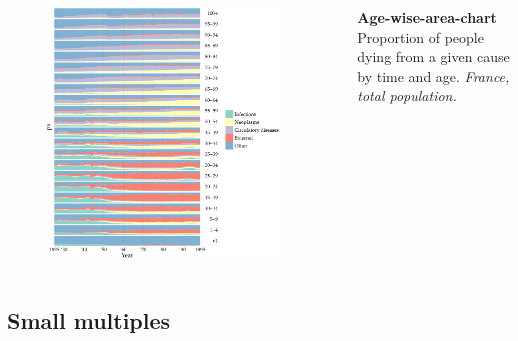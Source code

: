 \documentclass{beamer}
\begin{document}
\begin{frame}
\frametitle{\insertsection}

\begin{columns}[c]

\begin{figure}[htb!]
\includegraphics[width = 0.93\textwidth]{../fig/plot-agewise_area.pdf}
\end{figure}

\small \textbf{Age-wise-area-chart}\\ Proportion of people dying from a given cause by time and age. \scriptsize\emph{France, total population.}

\end{columns}

\end{frame}

%

\subsection{Small multiples}
\end{document}
